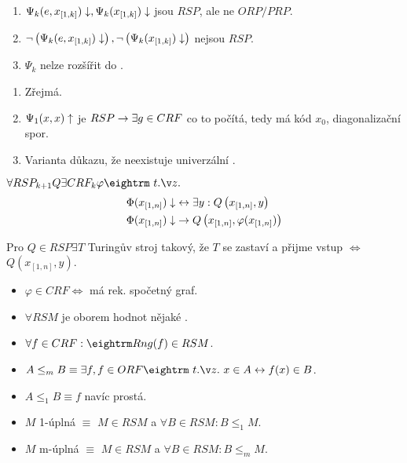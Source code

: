 \begin{multicols}{3}

\begin{enumerate}
\item $\Psi_k(e,x_{[1,k]})\downarrow, \Psi_k(x_{[1,k]})\downarrow$ jsou $RSP$, ale ne $ORP/PRP$.
\item $\neg\left(\Psi_k(e, x_{[1,k]})\downarrow\right), \neg\left(\Psi_k(x_{[1,k]})\downarrow\right)$ nejsou $RSP$.
\item $\Psi_k$ nelze rozšířit do \ORF.
\end{enumerate}

\prf{}

\begin{enumerate}
\item Zřejmá.
\item $\Psi_1(x,x)\uparrow$ je $RSP \rightarrow \exists g \in CRF$ co to počítá, tedy má kód $x_0$, diagonalizační spor.
\item Varianta důkazu, že neexistuje univerzální \PRF.\
\end{enumerate}

 $\forall RSP_{k+1} Q \exists CRF_k \varphi \st$
\begin{align*}
\Phi(x_{[1,n]})\downarrow &\leftrightarrow \exists y: Q\left(x_{[1,n]}, y\right)\\
\Phi(x_{[1,n]})\downarrow &\rightarrow Q\left(x_{[1,n]}, \varphi(x_{[1,n]})\right)
\end{align*}

\prf{} Pro $Q \in RSP \exists T$ Turingův stroj takový, že $T$ se zastaví a přijme vstup $\iff$ $Q(x_{[1,n]},y)$.

\begin{itemize}
\item $\varphi \in CRF \iff$ má rek. spočetný graf.
\item $\forall RSM$ je oborem hodnot nějaké \CRF.
\item $\forall f \in CRF: \rng(f) \in RSM$.
\end{itemize}

\begin{itemize}
\item $A \le_m B \equiv \exists f, f \in ORF \st x \in A \iff f(x) \in B$.
\item $A \le_1 B \equiv f$ navíc prostá.
\item $M$ 1-úplná $\equiv$ $M \in RSM$ a $\forall B \in RSM: B \le_1 M$.
\item $M$ m-úplná $\equiv$ $M \in RSM$ a $\forall B \in RSM: B \le_m M$.
\end{itemize}


\end{multicols}
